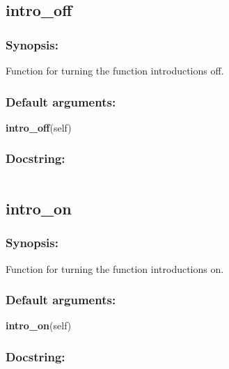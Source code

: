 {\scriptsize
\begin{verbatim}

\end{verbatim}
}



\newpage

\subsection{intro\_off}


\subsubsection{Synopsis:}

Function for turning the function introductions off.

\subsubsection{Default arguments:}

\textsf{\textbf{intro\_off}(self)
}


\subsubsection{Docstring:}

{\scriptsize
\begin{verbatim}

\end{verbatim}
}



\newpage

\subsection{intro\_on}


\subsubsection{Synopsis:}

Function for turning the function introductions on.

\subsubsection{Default arguments:}

\textsf{\textbf{intro\_on}(self)
}


\subsubsection{Docstring:}

